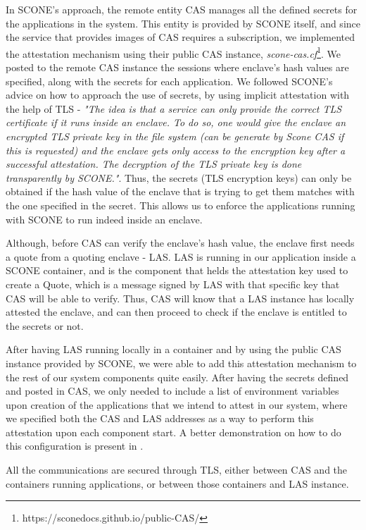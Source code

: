 In SCONE's approach, the remote entity CAS manages all the defined secrets for the applications in the system. This entity is provided by SCONE itself, and since the service that provides images of CAS requires a subscription, we implemented the attestation mechanism using their public CAS instance, \textit{scone-cas.cf}\footnote{https://sconedocs.github.io/public-CAS/}.
We posted to the remote CAS instance the sessions where enclave's hash values are specified, along with the secrets for each application. We followed SCONE's advice on how to approach the use of secrets, by using implicit attestation with the help of TLS - \textit{"The idea is that a service can only provide the correct TLS certificate if it runs inside an enclave. To do so, one would give the enclave an encrypted TLS private key in the file system (can be generate by Scone CAS if this is requested) and the enclave gets only access to the encryption key after a successful attestation. The decryption of the TLS private key is done transparently by SCONE."}.
Thus, the secrets (TLS encryption keys) can only be obtained if the hash value of the enclave that is trying to get them matches with the one specified in the secret. This allows us to enforce the applications running with SCONE to run indeed inside an enclave. 

Although, before CAS can verify the enclave's hash value, the enclave first needs a quote from a quoting enclave - LAS. LAS is running in our application inside a SCONE container, and is the component that helds the attestation key used to create a Quote, which is a message signed by LAS with that specific key that CAS will be able to verify. Thus, CAS will know that a LAS instance has locally attested the enclave, and can then proceed to check if the enclave is entitled to the secrets or not.

After having LAS running locally in a container and by using the public CAS instance provided by SCONE, we were able to add this attestation mechanism to the rest of our system components quite easily. After having the secrets defined and posted in CAS, we only needed to include a list of environment variables upon creation of the applications that we intend to attest in our system, where we specified both the CAS and LAS addresses as a way to perform this attestation upon each component start. A better demonstration on how to do this configuration is present in \cite{sconeAttestationConfig}. 

All the communications are secured through TLS, either between CAS and the containers running applications, or between those containers and LAS instance. 


